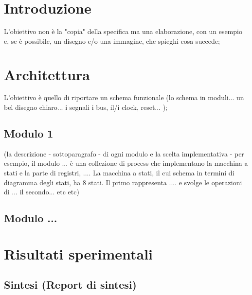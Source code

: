 \documentclass[11pt, a4paper]{article}
\begin{document}
    
    \section{Introduzione}
    \label{sec:intro}
    L'obiettivo non è la "copia" della specifica ma una elaborazione, con un
    esempio e, se è possibile, un disegno e/o una immagine, che spieghi cosa succede;

    \section{Architettura}
    \label{sec:arch}
    L’obiettivo è quello di riportare un schema funzionale (lo schema in
    moduli... un bel disegno chiaro... i segnali i bus, il/i clock, reset... );
    \subsection{Modulo 1}
    \label{subsec:mod1}
    (la descrizione - sottoparagrafo - di ogni modulo e la scelta
    implementativa - per esempio, il modulo ... è una collezione di process che
    implementano la macchina a stati e la parte di registri, .... La macchina a stati,
    il cui schema in termini di diagramma degli stati, ha 8 stati. Il primo
    rappresenta .... e svolge le operazioni di ... il secondo... etc etc)
    \subsection{Modulo ...}
    \label{subsec:mod}
    \section{Risultati sperimentali}
    \label{sec:result}
    \subsection{Sintesi (Report di sintesi)}
    \label{subsec:report}
\end{document}
